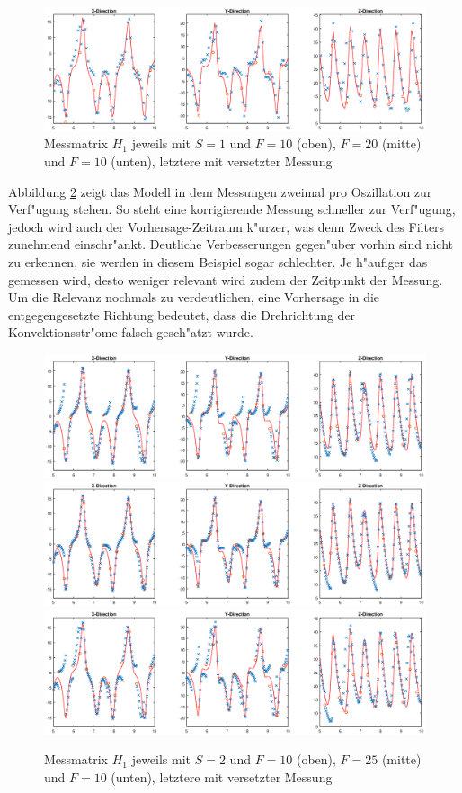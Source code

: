 \begin{refsection}
\begin{figure}
\includegraphics[width=\hsize]{kalman/figures/H1R10S1aS.eps}
\caption{Messmatrix $H_{1}$ jeweils mit $S=1$ und $F=10$ (oben), $F=20$ (mitte) und $F=10$ (unten), letztere mit versetzter Messung}
\label{kalman:H1S1}
\end{figure}

Abbildung \ref{kalman:H1S2} zeigt das Modell in dem Messungen zweimal pro Oszillation zur Verf"ugung stehen. So steht eine korrigierende Messung schneller zur Verf"ugung, jedoch wird auch der Vorhersage-Zeitraum k"urzer, was denn Zweck des Filters zunehmend einschr"ankt. Deutliche Verbesserungen gegen"uber vorhin sind nicht zu erkennen, sie werden in diesem Beispiel sogar schlechter. Je h"aufiger das gemessen wird, desto weniger relevant wird zudem der Zeitpunkt der Messung.
Um die Relevanz nochmals zu verdeutlichen, eine Vorhersage in die entgegengesetzte Richtung bedeutet, dass die Drehrichtung  der Konvektionsstr"ome falsch gesch"atzt wurde.
\begin{figure}
\centering
\includegraphics[width=\hsize]{kalman/figures/H1R10S2.eps}
\includegraphics[width=\hsize]{kalman/figures/H1R25S2.eps}
\includegraphics[width=\hsize]{kalman/figures/H1R10S2aS.eps}
\caption{Messmatrix $H_{1}$ jeweils mit $S=2$ und $F=10$ (oben), $F=25$ (mitte) und $F=10$ (unten), letztere mit versetzter Messung}
\label{kalman:H1S2}
\end{figure}


\end{refsection}
